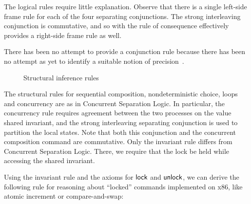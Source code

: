 \documentclass[11pt]{article}
\begin{document}
The logical rules require little explanation. Observe that there is a single left-side frame rule for each of the four separating conjunctions. The strong interleaving conjunction is commutative, and so with the rule of consequence effectively provides a right-side frame rule as well. 

There has been no attempt to provide a conjunction rule because there has been no attempt as yet to identify a suitable notion of precision~\cite{DBLP:journals/entcs/GotsmanBC11}. 

\begin{figure}[ht]
	\centering
	\caption{\label{fig:structural-inference-rules}Structural inference rules}
\end{figure}

The structural rules for sequential composition, nondeterministic choice, loops and concurrency are as in Concurrent Separation Logic. In particular, the concurrency rule requires agreement between the two processes on the value shared invariant, and the strong interleaving separating conjunction is used to partition the local states. Note that both this conjunction and the concurrent composition command are commutative. Only the invariant rule differs from Concurrent Separation Logic. There, we require that the lock be held while accessing the shared invariant. 

Using the invariant rule and the axioms for $\operatorname{\mathsf{lock}}$ and $\operatorname{\mathsf{unlock}}$, we can derive the following rule for reasoning about ``locked'' commands implemented on x86, like atomic increment or compare-and-swap: 
\end{document}

